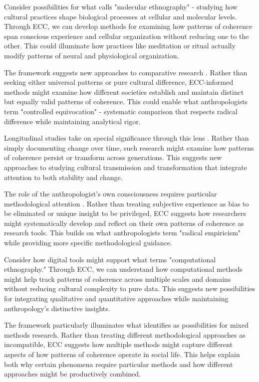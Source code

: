 \begin{refsection}
Consider possibilities for what \cite{myers2015rendering} calls "molecular ethnography" - studying how cultural practices shape biological processes at cellular and molecular levels. Through ECC, we can develop methods for examining how patterns of coherence span conscious experience and cellular organization without reducing one to the other. This could illuminate how practices like meditation or ritual actually modify patterns of neural and physiological organization.

The framework suggests new approaches to comparative research \cite{marcus2012multi}. Rather than seeking either universal patterns or pure cultural difference, ECC-informed methods might examine how different societies establish and maintain distinct but equally valid patterns of coherence. This could enable what anthropologists term "controlled equivocation" - systematic comparison that respects radical difference while maintaining analytical rigor.

Longitudinal studies take on special significance through this lens \cite{strathern2004partial}. Rather than simply documenting change over time, such research might examine how patterns of coherence persist or transform across generations. This suggests new approaches to studying cultural transmission and transformation that integrate attention to both stability and change.

The role of the anthropologist's own consciousness requires particular methodological attention \cite{rabinow2011accompaniment}. Rather than treating subjective experience as bias to be eliminated or unique insight to be privileged, ECC suggests how researchers might systematically develop and reflect on their own patterns of coherence as research tools. This builds on what anthropologists term "radical empiricism" while providing more specific methodological guidance.

Consider how digital tools might support what \cite{beaulieu2017vectors} terms "computational ethnography." Through ECC, we can understand how computational methods might help track patterns of coherence across multiple scales and domains without reducing cultural complexity to pure data. This suggests new possibilities for integrating qualitative and quantitative approaches while maintaining anthropology's distinctive insights.

The framework particularly illuminates what \cite{ladner2019mixed} identifies as possibilities for mixed methods research. Rather than treating different methodological approaches as incompatible, ECC suggests how multiple methods might capture different aspects of how patterns of coherence operate in social life. This helps explain both why certain phenomena require particular methods and how different approaches might be productively combined.


\end{refsection}
